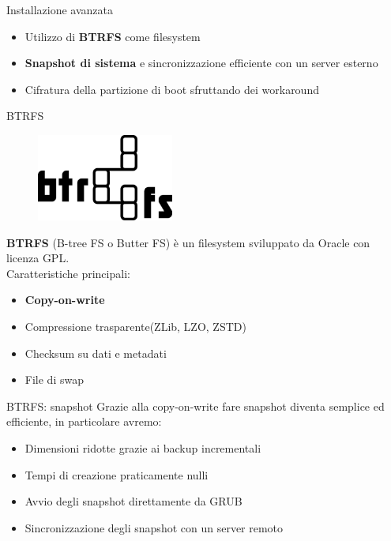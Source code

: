 \begin{frame}{Installazione avanzata}
    \begin{itemize}
        \item Utilizzo di \textbf{BTRFS} come filesystem
        \item \textbf{Snapshot di sistema} e sincronizzazione efficiente con un server esterno
        \item Cifratura della partizione di boot sfruttando dei workaround
    \end{itemize}
\end{frame}
\begin{frame}{BTRFS}
    \begin{figure}[h]
        \includegraphics[width=0.4\textwidth]{images/btrfs.png}
    \end{figure}
    \textbf{BTRFS} (B-tree FS o Butter FS) è un filesystem sviluppato da Oracle con licenza GPL.\\
    \vspace{10pt}
    Caratteristiche principali:
    \begin{itemize}
        \item \textbf{Copy-on-write}
        \item Compressione trasparente(ZLib, LZO, ZSTD)
        \item Checksum su dati e metadati
        \item File di swap
    \end{itemize}
\end{frame}
\begin{frame}{BTRFS: snapshot}
    Grazie alla copy-on-write fare snapshot diventa semplice ed efficiente, in particolare avremo:
    \begin{itemize}
        \item Dimensioni ridotte grazie ai backup incrementali
        \item Tempi di creazione praticamente nulli
        \item Avvio degli snapshot direttamente da GRUB
        \item Sincronizzazione degli snapshot con un server remoto
    \end{itemize}
\end{frame}

